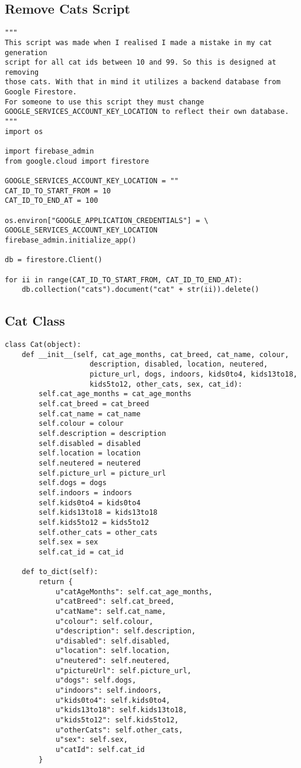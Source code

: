\subsection{Remove Cats Script}\label{REMOVECATSSCRIPT}

\begin{verbatim}
"""
This script was made when I realised I made a mistake in my cat generation
script for all cat ids between 10 and 99. So this is designed at removing 
those cats. With that in mind it utilizes a backend database from Google Firestore.
For someone to use this script they must change
GOOGLE_SERVICES_ACCOUNT_KEY_LOCATION to reflect their own database.
"""
import os

import firebase_admin
from google.cloud import firestore

GOOGLE_SERVICES_ACCOUNT_KEY_LOCATION = ""
CAT_ID_TO_START_FROM = 10
CAT_ID_TO_END_AT = 100

os.environ["GOOGLE_APPLICATION_CREDENTIALS"] = \
GOOGLE_SERVICES_ACCOUNT_KEY_LOCATION
firebase_admin.initialize_app()

db = firestore.Client()

for ii in range(CAT_ID_TO_START_FROM, CAT_ID_TO_END_AT):
    db.collection("cats").document("cat" + str(ii)).delete()
\end{verbatim}

\subsection{Cat Class}\label{CATCLASSSCRIPT}
\begin{verbatim}
class Cat(object):
    def __init__(self, cat_age_months, cat_breed, cat_name, colour, 
                    description, disabled, location, neutered,
                    picture_url, dogs, indoors, kids0to4, kids13to18,
                    kids5to12, other_cats, sex, cat_id):
        self.cat_age_months = cat_age_months
        self.cat_breed = cat_breed
        self.cat_name = cat_name
        self.colour = colour
        self.description = description
        self.disabled = disabled
        self.location = location
        self.neutered = neutered
        self.picture_url = picture_url
        self.dogs = dogs
        self.indoors = indoors
        self.kids0to4 = kids0to4
        self.kids13to18 = kids13to18
        self.kids5to12 = kids5to12
        self.other_cats = other_cats
        self.sex = sex
        self.cat_id = cat_id

    def to_dict(self):
        return {
            u"catAgeMonths": self.cat_age_months,
            u"catBreed": self.cat_breed,
            u"catName": self.cat_name,
            u"colour": self.colour,
            u"description": self.description,
            u"disabled": self.disabled,
            u"location": self.location,
            u"neutered": self.neutered,
            u"pictureUrl": self.picture_url,
            u"dogs": self.dogs,
            u"indoors": self.indoors,
            u"kids0to4": self.kids0to4,
            u"kids13to18": self.kids13to18,
            u"kids5to12": self.kids5to12,
            u"otherCats": self.other_cats,
            u"sex": self.sex,
            u"catId": self.cat_id
        }
\end{verbatim}

